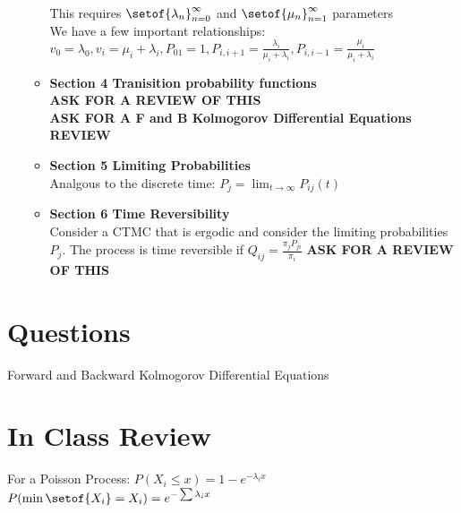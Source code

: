 \documentclass[answers,12pt,addpoints]{exam}
\begin{document}
\begin{itemize}
\begin{itemize}
        This requires $\setof{\lambda_n}_{n=0}^\infty$ and $\setof{\mu_n}_{n=1}^\infty$ parameters\\
        We have a few important relationships: \\
        $ v_0 = \lambda_0, v_i = \mu_i + \lambda_i, P_01 = 1, P_{i,i+1} = \frac{\lambda_i}{\mu_i + \lambda_i}, P_{i,i-1} = \frac{\mu_i}{\mu_i + \lambda_i}$\\
        \item \textbf{Section 4 Tranisition probability functions} \\
        \textbf{ASK FOR A REVIEW OF THIS}\\
        \textbf{ASK FOR A F and B Kolmogorov Differential Equations REVIEW}
        \item \textbf{Section 5 Limiting Probabilities} \\
        Analgous to the discrete time: $P_j = \lim_{t \to \infty} P_{ij}(t)$
        \item \textbf{Section 6 Time Reversibility} \\
        Consider a CTMC that is ergodic and consider the limiting probabilities $P_j$. The process is time reversible if $Q_{ij} = \frac{\pi_j P_{ji}}{\pi_i}$ \textbf{ASK FOR A REVIEW OF THIS}
    \end{itemize}
\end{itemize}


\section*{Questions}
Forward and Backward Kolmogorov Differential Equations



\section*{In Class Review}
For a Poisson Process: $P(X_i \leq x) = 1 - e^{-\lambda_i x}$ \\
$P(\min\setof{X_i} = X_i) = e^{-\sum \lambda_i x}$\\
\end{document}

